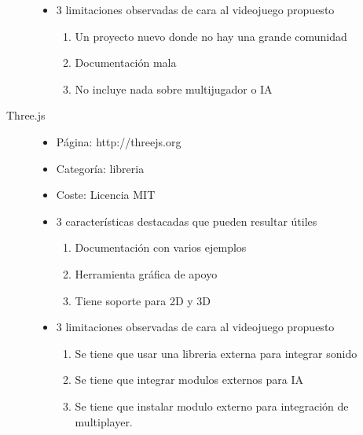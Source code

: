 \documentclass[a4paper]{article}
\begin{document}
\begin{description}
\begin{itemize}
\begin{enumerate}
            \end{enumerate}
        \item 3 limitaciones observadas de cara al videojuego propuesto
            \begin{enumerate}
                \item Un proyecto nuevo donde no hay una grande comunidad
                \item Documentación mala
                \item No incluye nada sobre multijugador o IA
            \end{enumerate}
    \end{itemize}
    \item[Three.js]
    \begin{itemize}
        \item Página: http://threejs.org
        \item Categoría: libreria
        \item Coste: Licencia MIT
        \item 3 características destacadas que pueden resultar útiles
            \begin{enumerate}
                \item Documentación con varios ejemplos
                \item Herramienta gráfica de apoyo
                \item Tiene soporte para 2D y 3D
            \end{enumerate}
        \item 3 limitaciones observadas de cara al videojuego propuesto
            \begin{enumerate}
                \item Se tiene que usar una libreria externa para integrar sonido
                \item Se tiene que integrar modulos externos para IA
                \item Se tiene que instalar modulo externo para integración de multiplayer.
            \end{enumerate}
    \end{itemize}




\end{description}
\end{document}
